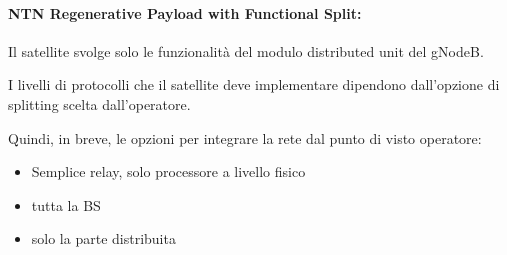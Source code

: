 \paragraph{NTN Regenerative Payload with Functional Split:} Il satellite svolge solo le funzionalità del modulo distributed unit del gNodeB. 

I livelli di protocolli che il satellite deve implementare dipendono dall'opzione di splitting scelta dall'operatore.

Quindi, in breve, le opzioni per integrare la rete dal punto di visto operatore:
\begin{itemize}
	\item Semplice relay, solo processore a livello fisico
	
    \item tutta la BS
	
    \item solo la parte distribuita
\end{itemize}

